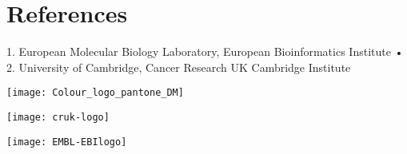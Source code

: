 \documentclass[a0,portrait]{a0poster}
\begin{document}
\section*{References}
\vspace{-1cm}
\begin{multicols}{2}
    \renewcommand\section[2]{}
    
\end{multicols}

\vfill
\noindent
\begin{center}
\normalsize%
1. European Molecular Biology Laboratory, European Bioinformatics Institute •
2. University of Cambridge, Cancer Research UK Cambridge Institute
\end{center}
\vspace{1cm}

\noindent
\begin{minipage}[][][b]{0.3\textwidth}
    \centering
    \texttt{[image: Colour\_logo\_pantone\_DM]}
\end{minipage}%
\hfill%
\begin{minipage}[][][b]{0.3\textwidth}
    \centering
    \texttt{[image: cruk-logo]}
\end{minipage}%
\hfill%
\begin{minipage}[][][b]{0.3\textwidth}
    \centering
    \texttt{[image: EMBL-EBIlogo]}
\end{minipage}%
\end{document}
